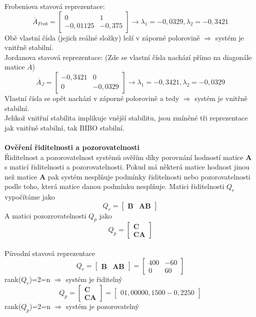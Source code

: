 \documentclass{article}
\begin{document}
			Frobeniova stavová reprezentace:
			\[\overline{A}_{Frob}=\begin{bmatrix}
				0&1\\
				-0,01125&-0,375
			\end{bmatrix}\rightarrow \lambda_{1}=-0,0329,\lambda_{2}=-0,3421\]
			Obě vlastní čísla (jejich reálné složky) leží v záporné polorovině $\Rightarrow$ systém je vnitřně stabilní.\\
			Jordanova stavová reprezentace:
			(Zde se vlastní čísla nachází přímo na diagonále matice \(A\))
			\[\overline{A}_{J}=\begin{bmatrix}
				-0,3421&0\\
				0&-0,0329
			\end{bmatrix}\rightarrow \lambda_{1}=-0,3421,\lambda_{2}=-0,0329\]
			Vlastní čísla se opět nachází v záporné polorovině a tedy $\Rightarrow$ systém je vnitřně stabilní.\\
			Jelikož vnitřní stabilita implikuje vnější stabilitu, jsou zmíněné tři reprezentace jak vnitřně stabilní, tak BIBO stabilní.\\\\
			\noindent
			\textbf{Ověření řiditelnosti a pozorovatelnosti}\\
			Řiditelnost a pozorovatelnost systémů ověřím díky porovnání hodností matice \textbf{A} s maticí řiditelnosti a pozorovatelnosti. Pokud má některá matice hodnost jinou než matice \(\textbf{A}\) pak systém nesplňuje podmínky řiditelnosti nebo pozorovatelnosti podle toho, která matice danou podmínku nesplňuje.
			Matici řiditelnosti \(Q_{r}\) vypočítáme jako
				\[Q_{r}=\begin{bmatrix}
					\textbf{B}&\textbf{AB}
				\end{bmatrix}\]
			A matici pozozrovatelnosti \(Q_{p}\) jako
				\[Q_{p}=\begin{bmatrix}
					\textbf{C}\\\textbf{CA}
				\end{bmatrix}\]\\
			Původní stavová reprezentace
				\[Q_{r}=\begin{bmatrix}
					\textbf{B}&\textbf{AB}
				\end{bmatrix}=\begin{bmatrix}
					400&-60\\
					0&60
				\end{bmatrix}\]\hspace{11cm}rank(\(Q_{r}\))=2=n $\Rightarrow$ systém je řiditelný
				\[Q_{p}=\begin{bmatrix}
					\textbf{C}\\\textbf{CA}
				\end{bmatrix}=\begin{bmatrix}
					     0    1,0000
					0,1500   -0,2250
				\end{bmatrix}\]\hspace{11cm}rank(\(Q_{p}\))=2=n $\Rightarrow$ systém je pozorovatelný\\
\end{document}
